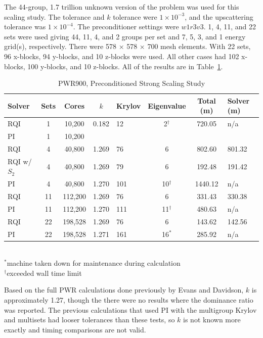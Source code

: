 The 44-group, 1.7 trillion unknown version of the problem was used for this scaling study. The tolerance and $k$ tolerance were $1 \times 10^{-3}$, and the upscattering tolerance was $1 \times 10^{-4}$. The preconditioner settings were $w1r3v3$. 1, 4, 11, and 22 sets were used giving 44, 11, 4, and 2 groups per set and 7, 5, 3, and 1 energy grid(s), respectively. There were 578 $\times$ 578 $\times$ 700 mesh elements. With 22 sets, 96 x-blocks, 94 y-blocks, and 10 z-blocks were used. All other cases had 102 x-blocks, 100 y-blocks, and 10 z-blocks. All of the results are in Table~\ref{table:full PWR}. 
%
\begin{table}[!h]
\caption{PWR900, Preconditioned Strong Scaling Study}
\begin{center}
\begin{tabular}{| l | c | c | c | l | c | c | l |}
\hline
Solver & Sets & Cores & $k$ & Krylov & Eigenvalue & Total (m) & Solver (m)\\[0.5ex]
\hline
RQI & 1   & 10,200   & 0.182 & 12    & 2$^{\dag}$ & 720.05    & n/a \\
PI    & 1   & 10,200   &  &  &       &  &  \\
RQI & 4   & 40,800   & 1.269 & 76   &  6               & 802.60   & 801.32 \\
RQI w/ $S_{2}$ & 4   & 40,800   & 1.269 & 79   &  6               & 192.48   & 191.42 \\
PI    & 4   & 40,800   & 1.270 & 101 & 10$^{\dag}$ & 1440.12 & n/a \\
RQI & 11 & 112,200 & 1.269 & 76   & 6                & 331.43    & 330.38 \\
PI    & 11 & 112,200 & 1.270 & 111 & 11$^{\dag}$ & 480.63    & n/a \\
RQI & 22 & 198,528 & 1.269 & 76   & 6                & 143.62    & 142.56 \\
PI    & 22 & 198,528 & 1.271 & 161 & 16$^{*}$      & 285.92    & n/a \\
\hline 
\end{tabular}\\
$^{*}$machine taken down for maintenance during calculation \\
$^{\dag}$exceeded wall time limit
\end{center}
\label{table:full PWR}
\end{table}  

Based on the full PWR calculations done previously by Evans and Davidson, $k$ is approximately 1.27, though the there were no results where the dominance ratio was reported. The previous calculations that used PI with the multigroup Krylov and multisets had looser tolerances than these tests, so $k$ is not known more exactly and timing comparisons are not valid. 

